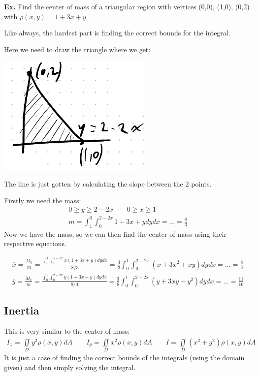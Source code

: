 \documentclass[12pt,letterpaper]{article} \usepackage{amsmath} \usepackage{graphicx} \usepackage[margin=1in]{geometry} \usepackage{longtable}  \usepackage{amssymb}
\begin{document}
	\begin{mdframed}[]
	\textbf{Ex. } Find the center of mass of a triangular region with vertices (0,0), (1,0), (0,2) with $\rho (x,y) = 1+3x+y$
	
	Like always, the hardest part is finding the correct bounds for the integral.
	
	Here we need to draw the triangle where we get:
	\begin{center}
		\includegraphics[width=0.2\linewidth]{ex2}
	\end{center}
	The line is just gotten by calculating the slope between the 2 points. 
	
	Firstly we need the mass:
	\begin{align*}
		0\ge y \ge 2-2x \qquad 0\ge x\ge 1\\
		m = \int ^0_1 \int^{2-2x}_0 1+3x+y dydx = ... = \frac{8}{3}
	\end{align*}
	Now we have the mass, so we can then find the center of mass using their respective equations.
	
	\begin{align*}
		\overline{x}= \frac{M_y}{m} = \frac{\int^1_0 \int^{2-2x}_0 x (1+3x+y) dydx}{8/3} = \frac{3}{8} \int^1_0 \int^{2-2x}_0 \left(x+3x^2 +xy\right) dydx = ... = \frac{8}{3} \\
		\overline{y} = \frac{M_x}{m} = \frac{\int^1_0 \int^{2-2x}_0 y (1+3x+y) dydx}{8/3} = \frac{3}{8} \int^1_0 \int^{2-2x}_0 \left(y+3xy +y^2\right) dydx = ... = \frac{11}{16}	
	\end{align*}
	
	\end{mdframed}
	
	\subsection{Inertia}
	This is very similar to the center of mass:
	\begin{align*}
		I_x = \iint\limits_D y^2 \rho(x,y) dA \qquad I_y = \iint\limits_D x^2 \rho(x,y)dA \qquad I = \iint\limits_D \left(x^2 + y^2 \right) \rho(x,y) dA
	\end{align*}
	It is just a case of finding the correct bounds of the integrals (using the domain given) and then simply solving the integral.
	
\end{document}
